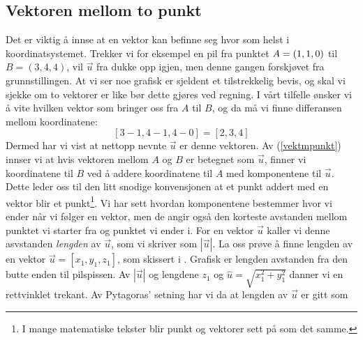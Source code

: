 \subsection{Vektoren mellom to punkt}
Det er viktig å innse at en vektor kan befinne seg hvor som helst i koordinatsystemet. Trekker vi for eksempel en pil fra punktet $ A=(1, 1,\newline 0) $ til $B=(3, 4, 4) $, vil $ \vec{u} $ fra  dukke opp igjen, men denne gangen forskjøvet fra grunnstillingen.
At vi ser noe grafisk er sjeldent et tilstrekkelig bevis, og skal vi sjekke om to vektorer er like bør dette gjøres ved regning. I vårt tilfelle ønsker vi å vite hvilken vektor som bringer oss fra $ A $ til $ B $, og da må vi finne differansen mellom koordinatene:
\[ [3-1, 4-1, 4-0]=[2, 3, 4] \]
Dermed har vi vist at nettopp nevnte $ \vec{u} $ er denne vektoren.\regv
\lvek
\lveke
{}
Av (\ref{vektmpunkt}) innser vi at hvis vektoren mellom $ A $ og $ B $ er betegnet som $ \vec{u} $, finner vi koordinatene til $ B $ ved å addere koordinatene til $ A $ med komponentene til $ \vec{u} $. Dette leder oss til den litt snodige konvensjonen at et punkt addert med en vektor blir et punkt\footnote{I mange matematiske tekster blir punkt og vektorer sett på som det samme.}.\regv
\rgnreg
\newpage
\paraeto
{}
Vi har sett hvordan komponentene bestemmer hvor vi ender når vi følger en vektor, men de angir også den korteste avstanden mellom punktet vi starter fra og punktet vi ender i. For en vektor $ \vec{u} $ kaller vi denne asvstanden \textit{lengden} av $ \vec{u} $, som vi skriver som $ |\vec{u}| $. La oss prøve å finne lengden av en vektor $ {\vec{u}=[x_1, y_1, z_1]} $, som skissert i . Grafisk er lengden avstanden fra den butte enden til pilspissen.
Av $ |\vec{u}| $ og lengdene $ z_1 $ og $ \hat{u}=\sqrt{x_1^2+y_1^2} $ danner vi en rettvinklet trekant. Av Pytagoras' setning har vi da at lengden av $ \vec{u} $ er gitt som
\len
\lene
{}
